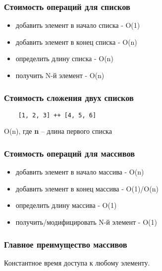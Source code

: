 \documentclass[10pt]{beamer}
\begin{document}
\begin{frame}
  \frametitle{Стоимость операций для списков}
  \begin{itemize}
  \item добавить элемент в начало списка - O(1)
  \item добавить элемент в конец списка - O(n)
  \item определить длину списка - O(n)
  \item получить N-й элемент - O(n)
  \end{itemize}
\end{frame}

\begin{frame}[fragile]
  \frametitle{Стоимость сложения двух списков}
  \begin{lstlisting}
    [1, 2, 3] ++ [4, 5, 6]
  \end{lstlisting}
  \par \bigskip
  O(n), где \textbf{n} -- длина первого списка
\end{frame}

\begin{frame}
  \frametitle{Стоимость операций для массивов}
  \begin{itemize}
  \item добавить элемент в начало массива - O(n)
  \item добавить элемент в конец массива - O(1)/O(n)
  \item определить длину массива - O(1)
  \item получить/модифицировать N-й элемент - O(1)
  \end{itemize}
\end{frame}

\begin{frame}
  \frametitle{Главное преимущество массивов}
  Константное время доступа к любому элементу.
\end{frame}
\end{document}
